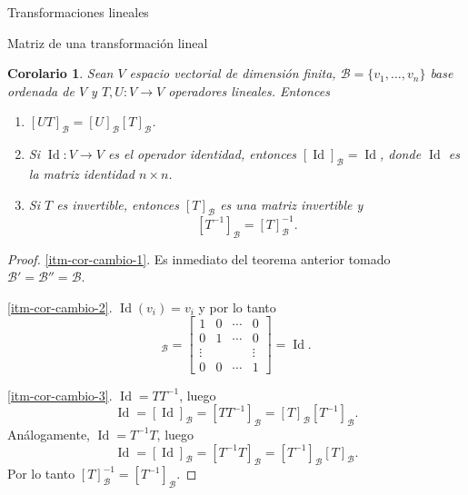 \documentclass[a4paper,12pt,twoside,spanish,reqno]{amsbook}
\numberwithin{equation}{section}
\newtheorem{corolario}[teorema]{Corolario}
\theoremstyle{definition}
\theoremstyle{remark}
\newcommand{\Id}{\operatorname{Id}}
\begin{document}
\begin{chapter}{Transformaciones lineales}
\begin{section}{Matriz de una transformación lineal}
        \begin{corolario}\label{cor-5.6} Sean $V$ espacio vectorial de dimensión finita, $\mathcal B = \{v_1,\ldots,v_n\}$ base ordenada de $V$ y $T,U: V \to V$ operadores lineales. Entonces
            \begin{enumerate}
                \item\label{itm-cor-cambio-1} $[UT]_{\mathcal B} = [U]_{\mathcal B} [T]_{\mathcal B}$.
                \item\label{itm-cor-cambio-2} Si $\Id: V \to V$  es el operador identidad, entonces $[\Id]_{\mathcal B} =\Id$,  donde $\Id$  es la matriz identidad $n \times n$.
                \item\label{itm-cor-cambio-3} Si $T$  es invertible,  entonces $[T]_{\mathcal B}$  es una matriz invertible y  $$[T^{-1}]_{\mathcal B} = [T]_{\mathcal B}^{-1}.$$
            \end{enumerate}
        \end{corolario}
        \begin{proof}
            \ref{itm-cor-cambio-1}. Es inmediato del teorema anterior tomado $\mathcal B' =\mathcal B'' = \mathcal B$. 
            
            \ref{itm-cor-cambio-2}. $\Id(v_i) = v_i$ y por lo tanto
            \begin{equation*}
                [\Id]_{\mathcal B} = \begin{bmatrix} 1&0&\cdots&0 \\0&1&\cdots&0\\\vdots&&&\vdots\\0&0&\cdots&1 	\end{bmatrix} = \Id.
            \end{equation*}
            
            
            \ref{itm-cor-cambio-3}. $\Id = T T^{-1}$, luego
            \begin{equation*}
                \Id = [\Id]_{\mathcal B} =  [T T^{-1}]_{\mathcal B} =  [T]_{\mathcal B} [T^{-1}]_{\mathcal B}.
            \end{equation*}
             Análogamente, $\Id = T^{-1} T$, luego
            \begin{equation*}
            \Id = [\Id]_{\mathcal B} =  [T^{-1} T]_{\mathcal B} =  [T^{-1}]_{\mathcal B} [T]_{\mathcal B}. 
            \end{equation*}
            Por  lo tanto $[T]_{\mathcal B}^{-1} = [T^{-1}]_{\mathcal B}$.
        \end{proof}	
    

\end{section}
\end{chapter}
\end{document}
